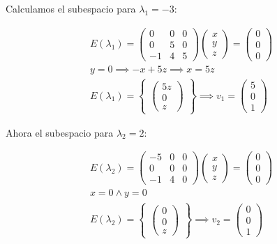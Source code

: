 \documentclass[12pt]{article}
\begin{document}
Calculamos el subespacio para \(\lambda_{1} = -3\):

\begin{align*}
	E(\lambda_{1}) =
	\begin{pmatrix}
		0 & 0 & 0 \\0&5&0\\-1&4&5
	\end{pmatrix}
	\begin{pmatrix}
		x \\y\\z
	\end{pmatrix}
	=
	\begin{pmatrix}
		0 \\0\\0
	\end{pmatrix}                                   \\
	\boxed{y=0} \implies -x+5z \implies \boxed{x=5z} \\
	E(\lambda_{1}) =
	\begin{Bmatrix}
		\begin{pmatrix}
			5z \\0\\z
		\end{pmatrix}
	\end{Bmatrix}
	\implies
	v_{1} =
	\begin{pmatrix}
		5 \\0\\1
	\end{pmatrix}
\end{align*}

Ahora el subespacio para \(\lambda_{2} = 2\):

\begin{align*}
	E(\lambda_{2}) =
	\begin{pmatrix}
		-5 & 0 & 0 \\
		0  & 0 & 0 \\
		-1 & 4 & 0
	\end{pmatrix}
	\begin{pmatrix}
		x \\y\\z
	\end{pmatrix}
	=
	\begin{pmatrix}
		0 \\0\\0
	\end{pmatrix}                \\
	\boxed{x=0} \land \boxed{y=0} \\
	E(\lambda_{2}) =
	\begin{Bmatrix}
		\begin{pmatrix}
			0 \\0\\z
		\end{pmatrix}
	\end{Bmatrix}
	\implies
	v_{2} =
	\begin{pmatrix}
		0 \\0\\1
	\end{pmatrix}
\end{align*}
\end{document}
